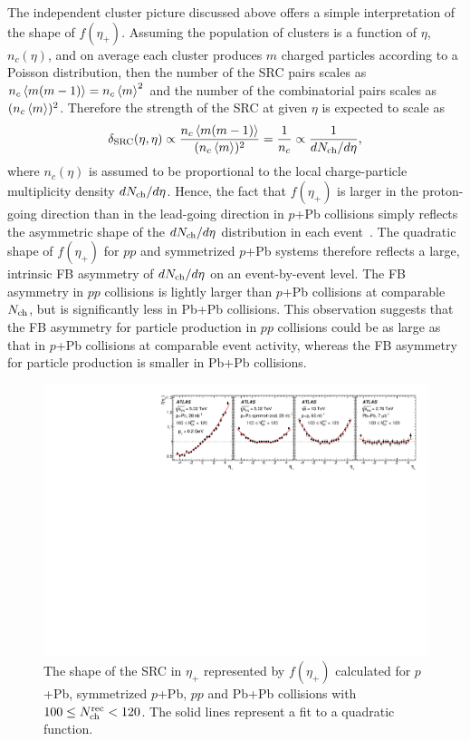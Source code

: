 The independent cluster picture discussed above offers a simple interpretation of the shape of $f(\eta_+)$. Assuming the population of clusters is a function of $\eta$, $n_c(\eta)$, and on average each cluster produces $m$ charged particles according to a Poisson distribution, then the number of the SRC pairs scales as $n_c\left\langle m(m-1)\right\rangle=n_c\left\langle m\right\rangle^2$ and the number of the combinatorial pairs scales as $(n_c\left\langle m\right\rangle)^2$. Therefore the strength of the SRC at given $\eta$ is expected to scale as
\begin{equation}
\delta_\text{SRC}(\eta, \eta) \propto \frac{n_c \left\langle m(m-1)\right\rangle}{(n_c\left\langle m\right\rangle)^2} = \frac{1}{n_c} \propto \frac{1}{dN_\text{ch} / d\eta},
\end{equation}
where $n_c(\eta)$ is assumed to be proportional to the local charge-particle multiplicity density $dN_\text{ch} / d\eta$. Hence, the fact that $f(\eta_+)$ is larger in the proton-going direction than in the lead-going direction in $p$+Pb collisions simply reflects the asymmetric shape of the $dN_\text{ch} / d\eta$ distribution in each event~\cite{ATLAS:2011ag}. The quadratic shape of $f(\eta_+)$ for $pp$ and symmetrized $p$+Pb systems therefore reflects a large, intrinsic FB asymmetry of $dN_\text{ch} / d\eta$ on an event-by-event level. The FB asymmetry in $pp$ collisions is lightly larger than $p$+Pb collisions at comparable $N_\text{ch}$, but is significantly less in Pb+Pb collisions. This observation suggests that the FB asymmetry for particle production in $pp$ collisions could be as large as that in $p$+Pb collisions at comparable event activity, whereas the FB asymmetry for particle production is smaller in Pb+Pb collisions.

\begin{figure}[H]
\centering
\includegraphics[width=.95\linewidth]{figs/chapter_fbcorr/ATLAS_SRC_shape.pdf}
\caption{The shape of the SRC in $\eta_+$ represented by $f(\eta_+)$ calculated for $p$+Pb, symmetrized $p$+Pb, $pp$ and Pb+Pb collisions with $100 \le N_\text{ch}^\text{rec} < 120$. The solid lines represent a fit to a quadratic function.}
\label{fig:fbcorr_ATLAS_SRC_shape}
\end{figure}

